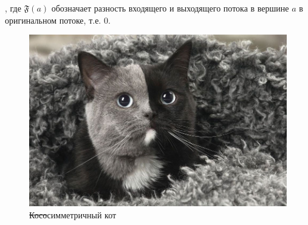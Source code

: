 , где \(\mathfrak{F}(a)\) обозначает разность входящего и выходящего потока в вершине \(a\) в оригинальном потоке, т.е. \(0\).

\begin{figure}[h]
    \centering
    \includegraphics[scale=0.35]{images/kot.jpg}
    \caption{\sout{Косо}симметричный кот}
\end{figure}

